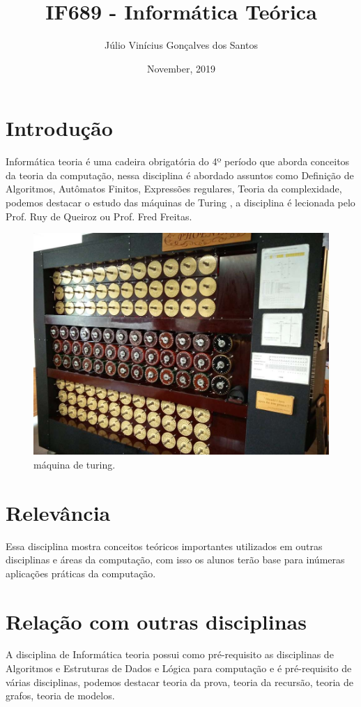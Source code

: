 \documentclass{article}
\title{IF689 - Informática Teórica}
\author{Júlio Vinícius Gonçalves dos Santos }
\date{November, 2019}
\begin{document}
\maketitle

\section{Introdução}
\quad Informática teoria é uma cadeira obrigatória do 4º período que aborda conceitos da teoria da computação, nessa disciplina é abordado assuntos como Definição de Algoritmos, Autômatos Finitos, Expressões regulares, Teoria da complexidade, podemos destacar o estudo das máquinas de Turing \citep{cinWiki} , a disciplina é lecionada pelo Prof. Ruy de Queiroz ou Prof. Fred Freitas.\citep{cinWiki2}

\begin{figure}[h!]
\centering
\includegraphics[scale=0.22]{Mturing}
\caption{máquina de turing. \cite{imagem}}
\end{figure}


\section{Relevância}
\quad Essa disciplina mostra conceitos teóricos importantes utilizados em outras disciplinas e áreas da computação, com isso os alunos terão base para inúmeras aplicações práticas da computação.
\section{Relação com outras disciplinas}
\quad A disciplina de Informática teoria possui como pré-requisito as disciplinas de Algoritmos e Estruturas de Dados e Lógica para computação e é pré-requisito de várias disciplinas, podemos destacar teoria da prova, teoria da recursão, teoria de grafos, teoria de modelos. \citep{ufpe}


\end{document}
